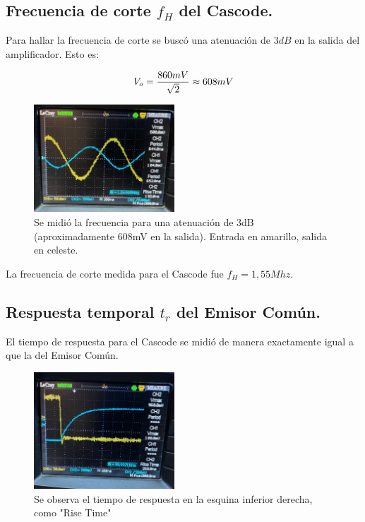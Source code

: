 \documentclass[letterpaper, 10 pt, conference]{ieeeconf}  %
\begin{document}
\subsection{\textbf{Frecuencia de corte $f_H$ del Cascode.}}

Para hallar la frecuencia de corte se buscó una atenuación de $3dB$ en la salida del amplificador. Esto es:

\begin{equation}
V_o = \frac{860mV}{\sqrt{2}} \approx 608mV \\
\end{equation}

\begin{figure}[H]
  \centering
  \includegraphics[width=0.47\textwidth]{imagenes/frecuencia_corte_CASCODE.jpg}
  \caption{Se midió la frecuencia para una atenuación de 3dB (aproximadamente 608mV en la salida). Entrada en amarillo, salida en celeste.}
  \label{fig:freq_corte_EC}
\end{figure}

La frecuencia de corte medida para el Cascode fue $f_H = 1,55Mhz$.

\subsection{\textbf{Respuesta temporal $t_r$ del Emisor Común.}}

El tiempo de respuesta para el Cascode se midió de manera exactamente igual a que la del Emisor Común.\\

\begin{figure}[H]
  \centering
  \includegraphics[width=0.47\textwidth]{imagenes/tiempo de respuesta CASCODE.png}
  \caption{Se observa el tiempo de respuesta en la esquina inferior derecha, como "Rise Time"}
  \label{fig:tr_EC}
\end{figure}
\end{document}
